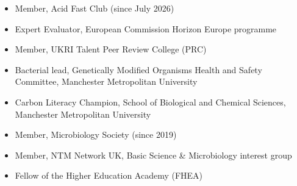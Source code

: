 \documentclass[10pt,a4paper]{article}
\begin{document}
\begin{itemize}
\item Member, Acid Fast Club (since July 2026)
\item Expert Evaluator, European Commission Horizon Europe programme
\item Member, UKRI Talent Peer Review College (PRC)
\item Bacterial lead, Genetically Modified Organisms Health and Safety Committee, Manchester Metropolitan University
\item Carbon Literacy Champion, School of Biological and Chemical Sciences, Manchester Metropolitan University
\item Member, Microbiology Society (since 2019)
\item Member, NTM Network UK, Basic Science \& Microbiology interest group
\item Fellow of the Higher Education Academy (FHEA)
\end{itemize}
\end{document}
